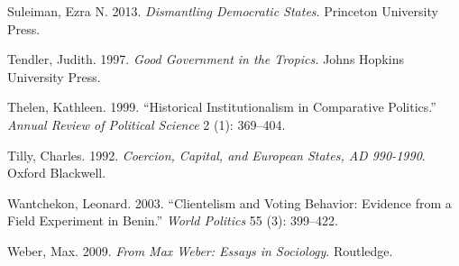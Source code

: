 \documentclass[12pt,]{article}
\begin{document}
\leavevmode\hypertarget{ref-suleiman_dismantling_2013}{}%
Suleiman, Ezra N. 2013. \emph{Dismantling Democratic States}. Princeton
University Press.

\leavevmode\hypertarget{ref-tendler_good_1997}{}%
Tendler, Judith. 1997. \emph{Good Government in the Tropics.} Johns
Hopkins University Press.

\leavevmode\hypertarget{ref-thelen_historical_1999}{}%
Thelen, Kathleen. 1999. ``Historical Institutionalism in Comparative
Politics.'' \emph{Annual Review of Political Science} 2 (1): 369--404.

\leavevmode\hypertarget{ref-tilly_coercion_1992}{}%
Tilly, Charles. 1992. \emph{Coercion, Capital, and European States, AD
990-1990}. Oxford Blackwell.

\leavevmode\hypertarget{ref-wantchekon_clientelism_2003}{}%
Wantchekon, Leonard. 2003. ``Clientelism and Voting Behavior: Evidence
from a Field Experiment in Benin.'' \emph{World Politics} 55 (3):
399--422.

\leavevmode\hypertarget{ref-weber_max_2009}{}%
Weber, Max. 2009. \emph{From Max Weber: Essays in Sociology}. Routledge.
\end{document}

